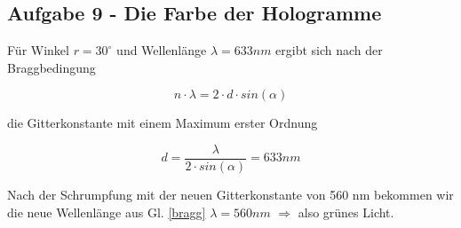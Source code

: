\subsection*{Aufgabe 9 - Die Farbe der Hologramme}
Für Winkel $r = 30^{\circ}$ und Wellenlänge $\lambda = 633 nm$ ergibt sich nach der Braggbedingung 

\begin{equation}
\label{bragg}
	n \cdot \lambda = 2 \cdot d\cdot sin \left( \alpha \right)
\end{equation}

die Gitterkonstante mit einem Maximum erster Ordnung

\begin{equation}
	d = \frac{\lambda}{2 \cdot sin \left(\alpha \right)} = 633 nm
\end{equation} 

Nach der Schrumpfung mit der neuen Gitterkonstante von 560 nm bekommen wir die neue Wellenlänge aus Gl. \eqref{bragg} $\lambda = 560 nm$ $\Rightarrow$ also grünes Licht.